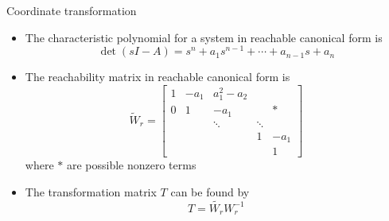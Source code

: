 \documentclass{beamer-control}
\begin{document}
\begin{frame}{Coordinate transformation}
\begin{itemize}
	\item The characteristic polynomial for a system in reachable canonical form is 
	\[\operatorname{det}(sI-A)= s^n+a_1s^{n-1}+\cdots + a_{n-1}s+a_n\]
	\item The reachability matrix in reachable canonical form is
	\[\tilde{W}_r = \begin{bmatrix}
		1 & -a_1 & a_1^2-a_2 & & \\
		0 & 1 & -a_1 & & * \\
		& & \ddots & \ddots & \\
		&  & & 1 & -a_1 \\
		& & & & 1
	\end{bmatrix}\]
	where $*$ are possible nonzero terms
	\item The transformation matrix $T$ can be found by 
	\[T=\tilde{W_r} W_r^{-1}\]
\end{itemize}
\end{frame}


\SUMMARYFRAME
\FINALE
\end{document}

